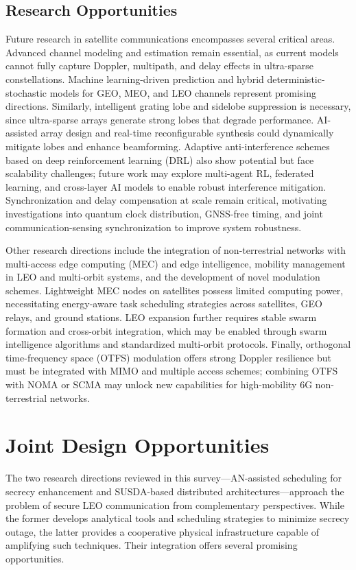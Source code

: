 \documentclass[conference]{IEEEtran}
\begin{document}
\subsection{Research Opportunities} \label{sec4.4}
Future research in satellite communications encompasses several critical areas. Advanced channel modeling and estimation remain essential, as current models cannot fully capture Doppler, multipath, and delay effects in ultra-sparse constellations. Machine learning-driven prediction and hybrid deterministic-stochastic models for GEO, MEO, and LEO channels represent promising directions. Similarly, intelligent grating lobe and sidelobe suppression is necessary, since ultra-sparse arrays generate strong lobes that degrade performance. AI-assisted array design and real-time reconfigurable synthesis could dynamically mitigate lobes and enhance beamforming. Adaptive anti-interference schemes based on deep reinforcement learning (DRL) also show potential but face scalability challenges; future work may explore multi-agent RL, federated learning, and cross-layer AI models to enable robust interference mitigation. Synchronization and delay compensation at scale remain critical, motivating investigations into quantum clock distribution, GNSS-free timing, and joint communication-sensing synchronization to improve system robustness.

Other research directions include the integration of non-terrestrial networks with multi-access edge computing (MEC) and edge intelligence, mobility management in LEO and multi-orbit systems, and the development of novel modulation schemes. Lightweight MEC nodes on satellites possess limited computing power, necessitating energy-aware task scheduling strategies across satellites, GEO relays, and ground stations. LEO expansion further requires stable swarm formation and cross-orbit integration, which may be enabled through swarm intelligence algorithms and standardized multi-orbit protocols. Finally, orthogonal time-frequency space (OTFS) modulation offers strong Doppler resilience but must be integrated with MIMO and multiple access schemes; combining OTFS with NOMA or SCMA may unlock new capabilities for high-mobility 6G non-terrestrial networks.

\section{Joint Design Opportunities} \label{sec5}
The two research directions reviewed in this survey—AN-assisted scheduling for secrecy enhancement and SUSDA-based distributed architectures—approach the problem of secure LEO communication from complementary perspectives. While the former develops analytical tools and scheduling strategies to minimize secrecy outage, the latter provides a cooperative physical infrastructure capable of amplifying such techniques. Their integration offers several promising opportunities.
\end{document}
